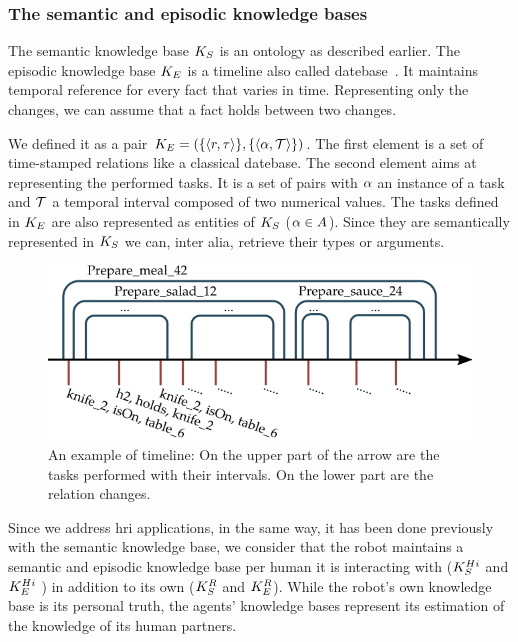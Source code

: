 \subsubsection{The semantic and episodic knowledge bases}

The semantic knowledge base $K_S$ is an ontology as described earlier. The episodic knowledge base $K_E$ is a timeline also called datebase~\cite{allen_1983_maintaining}. It maintains temporal reference for every fact that varies in time. Representing only the changes, we can assume that a fact holds between two changes.

We defined it as a pair $K_E = ( \{ \langle r, \tau \rangle \}, \{ \langle \alpha, \mathcal{T} \rangle \} )$. The first element is a set of time-stamped relations like a classical datebase. The second element aims at representing the performed tasks. It is a set of pairs with $\alpha$ an instance of a task and $\mathcal{T}$ a temporal interval composed of two numerical values. The tasks defined in $K_E$ are also represented as entities of $K_S$ ($\alpha \in A$). Since they are semantically represented in $K_S$ we can, inter alia, retrieve their types or arguments.

\begin{figure}[h!]
\centering
\includegraphics[scale=0.55]{figures/chapter6/ke.png}
\caption{\label{fig:chap6_ke} An example of timeline: On the upper part of the arrow are the tasks performed with their intervals. On the lower part are the relation changes.}
\end{figure}

Since we address \acrshort{hri} applications, in the same way, it has been done previously with the semantic knowledge base, we consider that the robot maintains a semantic and episodic knowledge base per human it is interacting with ($K_S^{Hi}$ and $K_E^{Hi}$ ) in addition to its own ($K_S^{R}$ and $K_E^{R}$). While the robot's own knowledge base is its personal truth, the agents' knowledge bases represent its estimation of the knowledge of its human partners.

